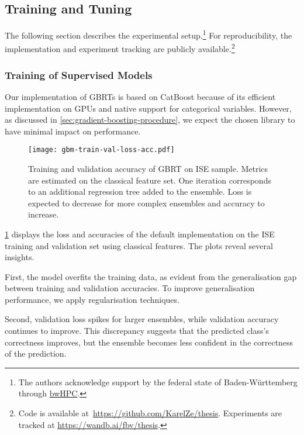 \subsection{Training and Tuning}\label{sec:training-and-tuning}

The following section describes the experimental setup.\footnote{The authors acknowledge support by the federal state of Baden-Württemberg through \href{https://www.bwhpc.de/}{bwHPC}.} For reproducibility, the implementation and experiment tracking are publicly available.\footnote{Code is available at~\url{https://github.com/KarelZe/thesis}. Experiments are tracked at \url{https://wandb.ai/fbv/thesis}.}

\subsubsection{Training of Supervised
    Models}\label{sec:training-of-supervised-models}

Our implementation of \glspl{GBRT} is based on CatBoost \autocite[][5--6]{prokhorenkovaCatBoostUnbiasedBoosting2018} because of its efficient implementation on \glspl{GPU} and native support for categorical variables. However, as discussed in \cref{sec:gradient-boosting-procedure}, we expect the chosen library to have minimal impact on performance.

\begin{figure}[ht]
    \centering
    \texttt{[image: gbm-train-val-loss-acc.pdf]}
    \caption[Training and Validation Accuracy of Gradient-Boosting]{Training and validation accuracy of \gls{GBRT} on \gls{ISE} sample. Metrics are estimated on the classical feature set. One iteration corresponds to an additional regression tree added to the ensemble. Loss is expected to decrease for more complex ensembles and accuracy to increase.}
    \label{fig:gbm-train-val-loss-acc}
\end{figure}

\cref{fig:gbm-train-val-loss-acc} displays the loss and accuracies of the default implementation on the \gls{ISE} training and validation set using classical features. The plots reveal several insights.

First, the model overfits the training data, as evident from the generalisation gap between training and validation accuracies. To improve generalisation performance, we apply regularisation techniques.

Second, validation loss spikes for larger ensembles, while validation accuracy continues to improve. This discrepancy suggests that the predicted class's correctness improves, but the ensemble becomes less confident in the correctness of the prediction.

